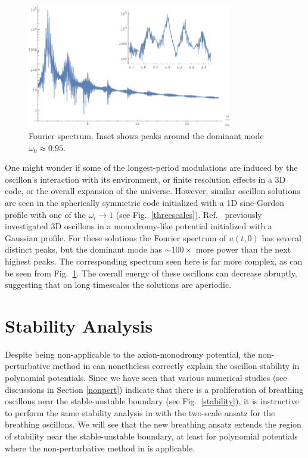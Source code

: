 \documentclass[11pt]{book}
\begin{document}
\begin{figure}
  \centering
  \includegraphics[width=0.8\textwidth]{plot/fourier.png}
  \caption{Fourier spectrum. Inset shows peaks around the dominant mode $\omega_0\approx0.95$.}\label{fourier}
\end{figure}

One might wonder if some of the longest-period modulations are induced by the oscillon's interaction with its environment, or finite resolution effects in a 3D code, or the overall expansion of the universe. However, similar oscillon solutions are seen in the spherically symmetric code initialized with a 1D sine-Gordon profile with one of the $\omega_i\to1$ (see Fig.~\ref{threescales}). Ref.~\cite{Salmi:2012ta} previously investigated 3D oscillons in a monodromy-like potential initialized with a Gaussian profile. For these solutions the Fourier spectrum of $u(t,0)$ has several distinct peaks, but the dominant mode has $\sim 100\times$ more power than the next highest peaks. The corresponding spectrum seen here is far more complex,  as can be seen from  Fig.~\ref{fourier}. The overall energy of these oscillons can decrease abruptly, suggesting that on long timescales the solutions are aperiodic.

\chapter{Stability Analysis}\label{chap:stability}

Despite being non-applicable to the axion-monodromy potential, the non-pertur\-bative method in \cite{PhysRevD.80.125037, Gleiser:2008ty} can nonetheless correctly explain the oscillon stability in polynomial potentials. Since we have seen that various numerical studies (see discussions in Section \ref{nonpert}) indicate that there is a proliferation of breathing oscillons near the stable-unstable boundary (see Fig.~\ref{stability}), it is instructive to perform the same stability analysis in \cite{PhysRevD.80.125037, Gleiser:2008ty} with the two-scale ansatz for the breathing oscillons. We will see that the new breathing ansatz extends the region of stability near the stable-unstable boundary, at least for polynomial potentials where the non-perturbative method in \cite{PhysRevD.80.125037, Gleiser:2008ty} is applicable.
\end{document}
